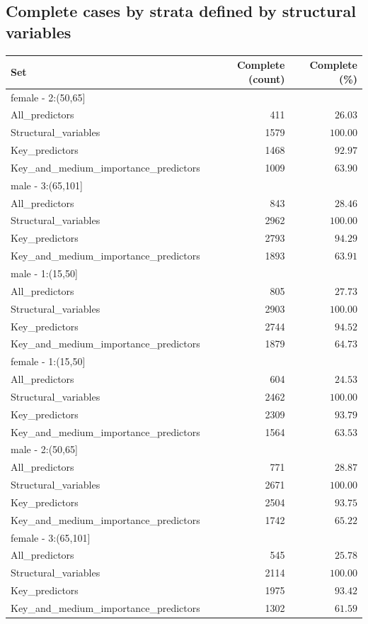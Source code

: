 \documentclass[
  letterpaper,
  DIV=11,
  numbers=noendperiod]{scrreport}
\begin{document}
\hypertarget{complete-cases-by-strata-defined-by-structural-variables}{%
\subsection{Complete cases by strata defined by structural
variables}\label{complete-cases-by-strata-defined-by-structural-variables}}

\captionsetup[table]{labelformat=empty,skip=1pt}
\begin{longtable}{lrr}
\toprule
\textbf{Set} & \textbf{Complete (count)} & \textbf{Complete (\%)} \\ 
\midrule
\multicolumn{1}{l}{female - 2:(50,65]} \\ 
\midrule
All\_predictors & 411 & $26.03$ \\ 
Structural\_variables & 1579 & $100.00$ \\ 
Key\_predictors & 1468 & $92.97$ \\ 
Key\_and\_medium\_importance\_predictors & 1009 & $63.90$ \\ 
\midrule
\multicolumn{1}{l}{male - 3:(65,101]} \\ 
\midrule
All\_predictors & 843 & $28.46$ \\ 
Structural\_variables & 2962 & $100.00$ \\ 
Key\_predictors & 2793 & $94.29$ \\ 
Key\_and\_medium\_importance\_predictors & 1893 & $63.91$ \\ 
\midrule
\multicolumn{1}{l}{male - 1:(15,50]} \\ 
\midrule
All\_predictors & 805 & $27.73$ \\ 
Structural\_variables & 2903 & $100.00$ \\ 
Key\_predictors & 2744 & $94.52$ \\ 
Key\_and\_medium\_importance\_predictors & 1879 & $64.73$ \\ 
\midrule
\multicolumn{1}{l}{female - 1:(15,50]} \\ 
\midrule
All\_predictors & 604 & $24.53$ \\ 
Structural\_variables & 2462 & $100.00$ \\ 
Key\_predictors & 2309 & $93.79$ \\ 
Key\_and\_medium\_importance\_predictors & 1564 & $63.53$ \\ 
\midrule
\multicolumn{1}{l}{male - 2:(50,65]} \\ 
\midrule
All\_predictors & 771 & $28.87$ \\ 
Structural\_variables & 2671 & $100.00$ \\ 
Key\_predictors & 2504 & $93.75$ \\ 
Key\_and\_medium\_importance\_predictors & 1742 & $65.22$ \\ 
\midrule
\multicolumn{1}{l}{female - 3:(65,101]} \\ 
\midrule
All\_predictors & 545 & $25.78$ \\ 
Structural\_variables & 2114 & $100.00$ \\ 
Key\_predictors & 1975 & $93.42$ \\ 
Key\_and\_medium\_importance\_predictors & 1302 & $61.59$ \\ 
\bottomrule
\end{longtable}
\end{document}
